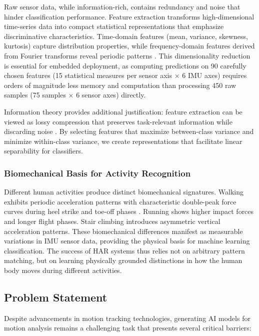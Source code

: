 Raw sensor data, while information-rich, contains redundancy and noise that hinder classification performance. Feature extraction transforms high-dimensional time-series data into compact statistical representations that emphasize discriminative characteristics. Time-domain features (mean, variance, skewness, kurtosis) capture distribution properties, while frequency-domain features derived from Fourier transforms reveal periodic patterns \cite{oppenheim1999discrete}. This dimensionality reduction is essential for embedded deployment, as computing predictions on 90 carefully chosen features (15 statistical measures per sensor axis × 6 IMU axes) requires orders of magnitude less memory and computation than processing 450 raw samples (75 samples × 6 sensor axes) directly.

Information theory provides additional justification: feature extraction can be viewed as lossy compression that preserves task-relevant information while discarding noise \cite{cover2006elements}. By selecting features that maximize between-class variance and minimize within-class variance, we create representations that facilitate linear separability for classifiers.

\subsubsection{Biomechanical Basis for Activity Recognition}

Different human activities produce distinct biomechanical signatures. Walking exhibits periodic acceleration patterns with characteristic double-peak force curves during heel strike and toe-off phases \cite{whittle2014gait}. Running shows higher impact forces and longer flight phases. Stair climbing introduces asymmetric vertical acceleration patterns. These biomechanical differences manifest as measurable variations in IMU sensor data, providing the physical basis for machine learning classification. The success of HAR systems thus relies not on arbitrary pattern matching, but on learning physically grounded distinctions in how the human body moves during different activities.

\subsection{Problem Statement}

Despite advancements in motion tracking technologies, generating AI models for motion analysis remains a challenging task that presents several critical barriers:

